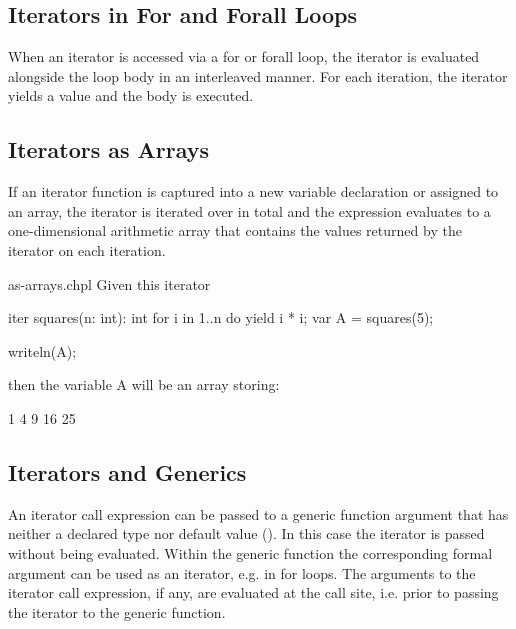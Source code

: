\subsection{Iterators in For and Forall Loops}
\label{Iterators_in_For_and_Forall_Loops}

When an iterator is accessed via a for or forall loop, the iterator is
evaluated alongside the loop body in an interleaved manner.  For each
iteration, the iterator yields a value and the body is executed.

\subsection{Iterators as Arrays}
\label{Iterators_as_Arrays}

If an iterator function is captured into a new variable declaration or
assigned to an array, the iterator is iterated over in total and the
expression evaluates to a one-dimensional arithmetic array that
contains the values returned by the iterator on each iteration.
\begin{chapelexample}{as-arrays.chpl}
Given this iterator
\begin{chapel}
iter squares(n: int): int {
  for i in 1..n do
    yield i * i;
}
var A = squares(5);
\end{chapel}
\begin{chapelpost}
writeln(A);
\end{chapelpost}
then the variable A will be an array storing:
\begin{chapelprintoutput}
1 4 9 16 25
\end{chapelprintoutput}
\end{chapelexample}

\subsection{Iterators and Generics}
\label{Iterators_and_Generics}

An iterator call expression can be passed to a generic function argument that
has neither a declared type nor default value
().
In this case the iterator is passed without being evaluated.
Within the generic function the corresponding formal argument
can be used as an iterator, e.g. in for loops.
The arguments to the iterator call expression, if any, are evaluated
at the call site, i.e. prior to passing the iterator to the generic function.


